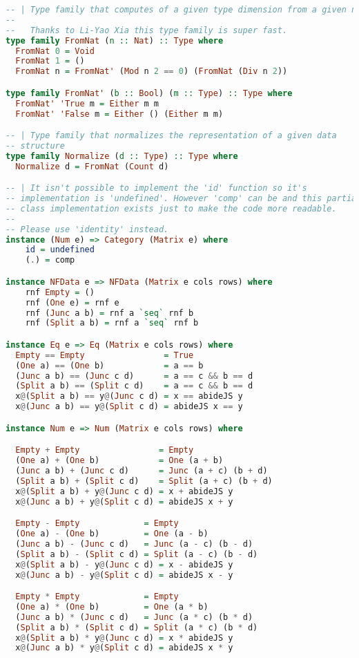 \documentclass[
  oneside,
  11pt, a4paper,
  footinclude=true,
  headinclude=true,
  cleardoublepage=empty
]{scrbook}
\theoremstyle{definition}
\theoremstyle{definition}
\begin{document}
\begin{lstlisting}[language=Haskell, caption={Matrix.Internal},captionpos=b]
-- | Type family that computes of a given type dimension from a given natural
--
--   Thanks to Li-Yao Xia this type family is super fast.
type family FromNat (n :: Nat) :: Type where
  FromNat 0 = Void
  FromNat 1 = ()
  FromNat n = FromNat' (Mod n 2 == 0) (FromNat (Div n 2))

type family FromNat' (b :: Bool) (m :: Type) :: Type where
  FromNat' 'True m = Either m m
  FromNat' 'False m = Either () (Either m m)

-- | Type family that normalizes the representation of a given data
-- structure
type family Normalize (d :: Type) :: Type where
  Normalize d = FromNat (Count d)

-- | It isn't possible to implement the 'id' function so it's
-- implementation is 'undefined'. However 'comp' can be and this partial
-- class implementation exists just to make the code more readable.
--
-- Please use 'identity' instead.
instance (Num e) => Category (Matrix e) where
    id = undefined
    (.) = comp

instance NFData e => NFData (Matrix e cols rows) where
    rnf Empty = ()
    rnf (One e) = rnf e
    rnf (Junc a b) = rnf a `seq` rnf b
    rnf (Split a b) = rnf a `seq` rnf b

instance Eq e => Eq (Matrix e cols rows) where
  Empty == Empty                = True
  (One a) == (One b)            = a == b
  (Junc a b) == (Junc c d)      = a == c && b == d
  (Split a b) == (Split c d)    = a == c && b == d
  x@(Split a b) == y@(Junc c d) = x == abideJS y
  x@(Junc a b) == y@(Split c d) = abideJS x == y

instance Num e => Num (Matrix e cols rows) where

  Empty + Empty                = Empty
  (One a) + (One b)            = One (a + b)
  (Junc a b) + (Junc c d)      = Junc (a + c) (b + d)
  (Split a b) + (Split c d)    = Split (a + c) (b + d)
  x@(Split a b) + y@(Junc c d) = x + abideJS y
  x@(Junc a b) + y@(Split c d) = abideJS x + y

  Empty - Empty             = Empty
  (One a) - (One b)         = One (a - b)
  (Junc a b) - (Junc c d)   = Junc (a - c) (b - d)
  (Split a b) - (Split c d) = Split (a - c) (b - d)
  x@(Split a b) - y@(Junc c d) = x - abideJS y
  x@(Junc a b) - y@(Split c d) = abideJS x - y

  Empty * Empty             = Empty
  (One a) * (One b)         = One (a * b)
  (Junc a b) * (Junc c d)   = Junc (a * c) (b * d)
  (Split a b) * (Split c d) = Split (a * c) (b * d)
  x@(Split a b) * y@(Junc c d) = x * abideJS y
  x@(Junc a b) * y@(Split c d) = abideJS x * y


\end{lstlisting}
\end{document}
